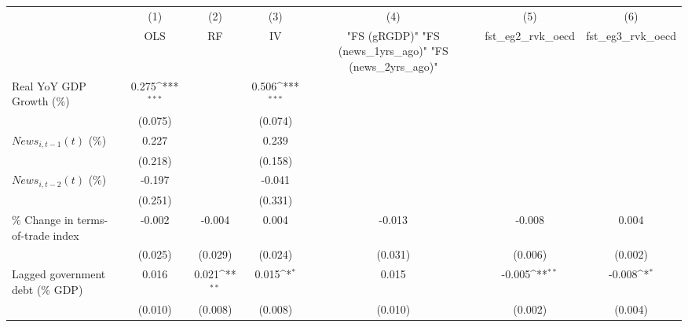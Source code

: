 {
\def\sym#1{\ifmmode^{#1}\else\(^{#1}\)\fi}
\begin{tabular}{l*{6}{c}}
\toprule
                    &\multicolumn{1}{c}{(1)}&\multicolumn{1}{c}{(2)}&\multicolumn{1}{c}{(3)}&\multicolumn{1}{c}{(4)}&\multicolumn{1}{c}{(5)}&\multicolumn{1}{c}{(6)}\\
                    &\multicolumn{1}{c}{OLS}&\multicolumn{1}{c}{RF}&\multicolumn{1}{c}{IV}&\multicolumn{1}{c}{ "FS (gRGDP)"  "FS (news_1yrs_ago)"  "FS (news_2yrs_ago)" }&\multicolumn{1}{c}{fst_eg2_rvk_oecd}&\multicolumn{1}{c}{fst_eg3_rvk_oecd}\\
\midrule
Real YoY GDP Growth (\%)&       0.275\sym{***}&                     &       0.506\sym{***}&                     &                     &                     \\
                    &     (0.075)         &                     &     (0.074)         &                     &                     &                     \\
\addlinespace
$ News_{i,t-1}(t)$ (\%)&       0.227         &                     &       0.239         &                     &                     &                     \\
                    &     (0.218)         &                     &     (0.158)         &                     &                     &                     \\
\addlinespace
$ News_{i,t-2}(t)$ (\%)&      -0.197         &                     &      -0.041         &                     &                     &                     \\
                    &     (0.251)         &                     &     (0.331)         &                     &                     &                     \\
\addlinespace
\% Change in terms-of-trade index&      -0.002         &      -0.004         &       0.004         &      -0.013         &      -0.008         &       0.004         \\
                    &     (0.025)         &     (0.029)         &     (0.024)         &     (0.031)         &     (0.006)         &     (0.002)         \\
\addlinespace
Lagged government debt (\% GDP)&       0.016         &       0.021\sym{**} &       0.015\sym{*}  &       0.015         &      -0.005\sym{**} &      -0.008\sym{*}  \\
                    &     (0.010)         &     (0.008)         &     (0.008)         &     (0.010)         &     (0.002)         &     (0.004)         \\

\end{tabular}}
